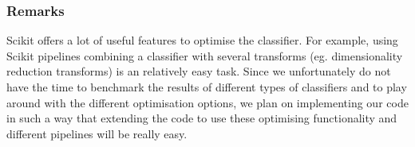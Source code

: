 \subsubsection{Remarks}
Scikit offers a lot of useful features to optimise the classifier. For example, using Scikit pipelines combining a classifier with several transforms (eg. dimensionality reduction transforms) is an relatively easy task. Since we unfortunately do not have the time to benchmark the results of different types of classifiers and to play around with the different optimisation options, we plan on implementing our code in such a way that extending the code to use these optimising functionality and different pipelines will be really easy.